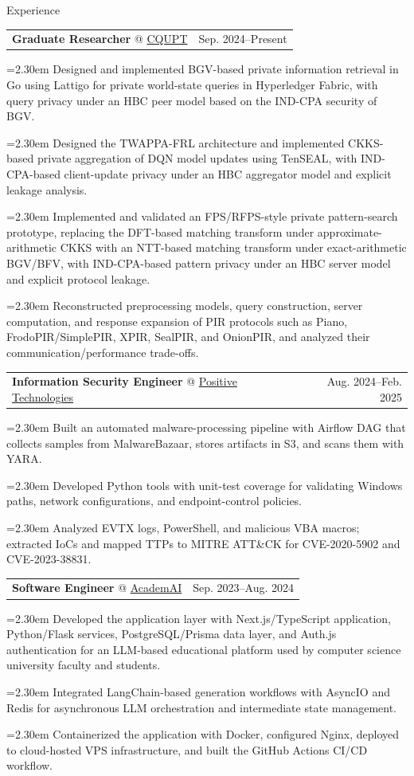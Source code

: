 \documentclass[11pt,a4paper]{article}
\makeatletter
\newcommand{\cvrow}[2]{%
  \noindent
  \begin{minipage}[t]{0.145\textwidth}
    \vspace{0pt}%
    \raggedright
    \fontsize{10.5}{12.5}\selectfont
    #1
  \end{minipage}%
  \hfill
  \begin{minipage}[t]{0.835\textwidth}
    \vspace{0pt}%
    #2
  \end{minipage}\par
}
\newcommand{\workentry}[2]{%
  \noindent
  \begin{tabularx}{\linewidth}
    {@{}X@{\hspace{0.8em}}r@{}}
    #1 & \small #2
  \end{tabularx}\par
  \vspace{0.15em}
}
\newcommand{\workproject}[1]{%
  \noindent
  \hangindent=2.30em
  \hangafter=1
  \hspace*{1.15em}\makebox[1.15em][l]{$\diamond$}#1\par
  \vspace{0.12em}
}
\makeatother
\begin{document}
\vspace{0.75em}

\cvrow{Experience}{%
  \workentry
    {\textbf{Graduate Researcher} @
    \href{https://www.cqupt.edu.cn/}{CQUPT}}
    {Sep. 2024--Present}

  \workproject{Designed and implemented BGV-based private information retrieval
  in Go using Lattigo for private world-state queries in Hyperledger Fabric,
  with query privacy under an HBC peer model based on the IND-CPA security of BGV.}

  \workproject{Designed the TWAPPA-FRL architecture and implemented CKKS-based
  private aggregation of DQN model updates using TenSEAL, with IND-CPA-based
  client-update privacy under an HBC aggregator model and explicit leakage analysis.}

  \workproject{Implemented and validated an FPS/RFPS-style private pattern-search
  prototype, replacing the DFT-based matching transform under approximate-arithmetic
  CKKS with an NTT-based matching transform under exact-arithmetic BGV/BFV,
  with IND-CPA-based pattern privacy under an HBC server model and explicit
  protocol leakage.}


  \workproject{Reconstructed preprocessing models, query construction,
  server computation, and response expansion of PIR protocols such as Piano,
  FrodoPIR/SimplePIR, XPIR, SealPIR, and OnionPIR, and analyzed their
  communication/performance trade-offs.}
}
\vspace{0.50em}

\cvrow{}{%
  \workentry
    {\textbf{Information Security Engineer} @
    \href{https://global.ptsecurity.com/en/}{Positive Technologies}}
    {Aug. 2024--Feb. 2025}
  \workproject{Built an automated malware-processing pipeline with Airflow DAG that
  collects samples from MalwareBazaar, stores artifacts in S3, and scans them with YARA.}
  \workproject{Developed Python tools with unit-test coverage for validating
  Windows paths, network configurations, and endpoint-control policies.}
  \workproject{Analyzed EVTX logs, PowerShell, and malicious VBA macros; extracted
  IoCs and mapped TTPs to MITRE ATT\&CK for CVE-2020-5902 and CVE-2023-38831.}
}

\vspace{0.50em}

\cvrow{}{%
  \workentry
    {\textbf{Software Engineer} @ \href{https://academai.ru/}{AcademAI}}
    {Sep. 2023--Aug. 2024}
  \workproject{Developed the application layer with Next.js/TypeScript application,
  Python/Flask services, PostgreSQL/Prisma data layer, and Auth.js authentication
  for an LLM-based educational platform used by computer science university faculty
  and students.}
  \workproject{Integrated LangChain-based generation workflows with AsyncIO and Redis for
  asynchronous LLM orchestration and intermediate state management.}
  \workproject{Containerized the application with Docker, configured Nginx, deployed
  to cloud-hosted VPS infrastructure, and built the GitHub Actions CI/CD workflow.}
}
\end{document}
